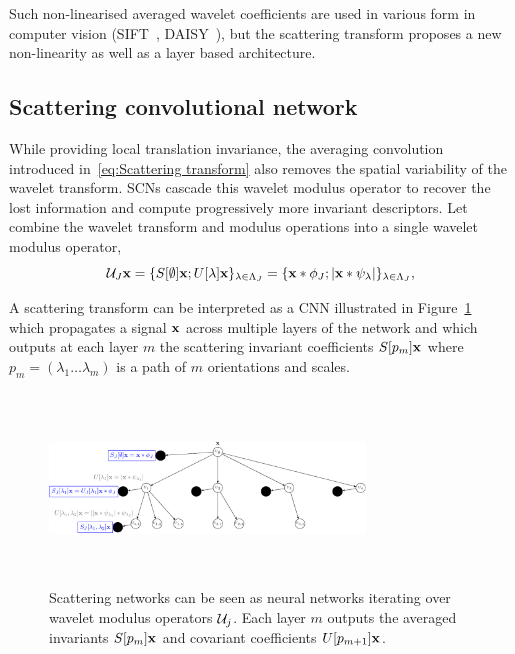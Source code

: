 \documentclass{article}
\begin{document}
    Such non-linearised averaged wavelet coefficients are used in various form in computer vision (SIFT~\citep{}, DAISY~\citep{}), but the scattering transform proposes a new non-linearity as well as a layer based architecture.
  
  \subsection{Scattering convolutional network}
    \label{subsec:SCN/SCN}
    
    While providing local translation invariance, the averaging convolution introduced in~\ref{eq:Scattering transform} also removes the spatial variability of the wavelet transform. SCNs cascade this wavelet modulus operator to recover the lost information and compute progressively more invariant descriptors. Let combine the wavelet transform and modulus operations into a single wavelet modulus operator,
    \vspace{-5pt}
    \begin{equation}
      \mathcal{U}_{J} {\bf x} = \{ S[\emptyset] {\bf x} ; U[\lambda]{\bf x} \}_{\lambda \in \Lambda_{J}} 
		      = \{ {\bf x} \ast \phi_{J}; \left| {\bf x} \ast \psi_{\lambda} \right| \}_{\lambda \in \Lambda_{J}},
      \label{eq:One step propagator}
    \end{equation}
    
    A scattering transform can be interpreted as a CNN illustrated in Figure~\ref{fig:SCN 1}~\citep{Deep Roto-Translation Scattering for Object Classification} which propagates a signal ${\bf x}$ across multiple layers of the network and which outputs at each layer $m$ the scattering invariant coefficients $S[p_{m}]{\bf x}$ where $p_{m}=(\lambda_{1} \dots \lambda_{m})$ is a path of $m$ orientations and scales.
    
    \begin{figure}
      \begin{center}
				\includegraphics[width=3.3in, height=2in, keepaspectratio]{ST_freqDec_crop.pdf}
				\caption[Scattering convolution network.]{\centering  Scattering networks can be seen as neural networks iterating over wavelet  modulus  operators $\mathcal{U}_{j}$. Each layer $m$ outputs the averaged  invariants $S[p_{m}]{\bf x}$ and covariant coefficients $U[p_{m+1}]{\bf x}$.}
				\label{fig:SCN 1}
      \end{center}
      \vspace{-15pt}
    \end{figure}
    
\end{document}
